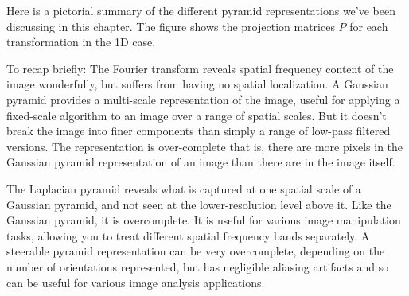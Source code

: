 Here is a pictorial summary of the different pyramid representations we've been discussing in this chapter.  The figure shows the projection matrices $P$ for each transformation in the 1D case.


To recap briefly:  The Fourier transform reveals spatial frequency content of the image wonderfully, but suffers from having no spatial localization. A Gaussian pyramid provides a multi-scale representation of the image, useful for applying a fixed-scale algorithm to an image over a range of spatial scales.  But it doesn't break the image into finer components than simply a range of low-pass filtered versions.  The representation is over-complete that is, there are more pixels in the Gaussian pyramid representation of an image than there are in the image itself.

The Laplacian pyramid reveals what is captured at one spatial scale of a Gaussian pyramid, and not seen at the lower-resolution level above it.  Like the Gaussian pyramid, it is overcomplete. It is useful for various image manipulation tasks, allowing you to treat different spatial frequency bands separately.
%
%
A steerable pyramid representation can be very overcomplete, depending on the number of orientations represented, but has negligible aliasing artifacts and so can be useful for various image analysis applications.
%
%
%


